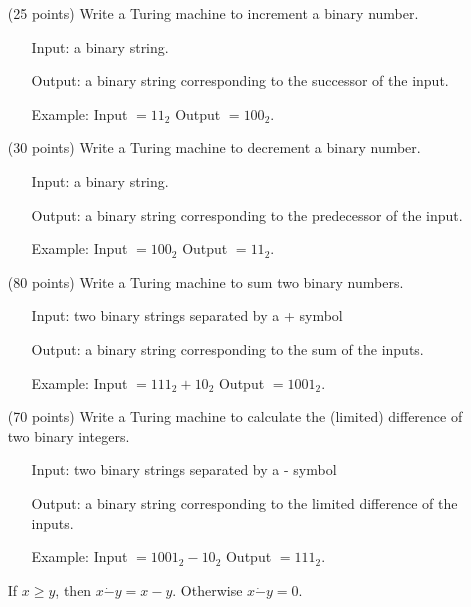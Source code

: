 \documentclass[11pt]{report}
\begin{document}
\begin{enumerate}
		\item[(25 points)] Write a Turing machine to increment a binary number. 
		
			\begin{itemize}
				\item[] Input: a binary string.
				\item[] Output: a binary string corresponding to the successor of the input.
				\item[] Example: Input $=11_{2}$ Output $= 100_{2}$.
			\end{itemize}

		\item[(30 points)] Write a Turing machine to decrement a binary number. 
		
			\begin{itemize}
				\item[] Input: a binary string.
				\item[] Output: a binary string corresponding to the predecessor of the input.
				\item[] Example: Input $=100_{2}$ Output $= 11_{2}$.
			\end{itemize}
							
		\item[(80 points)] Write a Turing machine to sum two binary numbers.
	
			\begin{itemize}
				\item[] Input: two binary strings separated by a + symbol
				\item[] Output: a binary string corresponding to the sum of the inputs. 
				\item[] Example: Input $= 111_{2} + 10_{2}$ Output $= 1001_{2}$.
			\end{itemize}
		
		\newpage
		\item[(70 points)] Write a Turing machine to calculate the (limited) difference of two binary integers.
		
			\begin{itemize}
				\item[] Input: two binary strings separated by a - symbol
				\item[] Output: a binary string corresponding to the limited difference of the inputs. 
				\item[] Example: Input $= 1001_{2} - 10_{2}$ Output $= 111_{2}$.
			\end{itemize}

			If $x \geq y$, then $x \dot - y = x - y$. Otherwise $x \dot - y = 0$. 
		

\end{enumerate}
\end{document}
